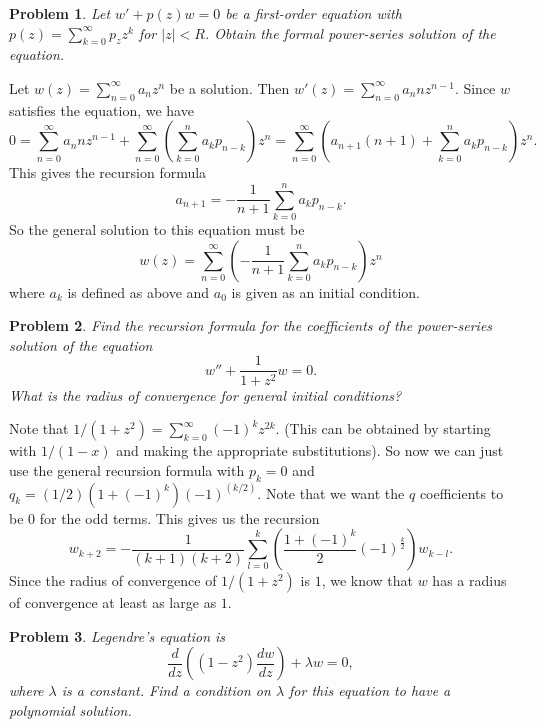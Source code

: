\documentclass{article}
\newtheorem{problem}{Problem}
\begin{document}
\begin{problem}
Let $w' + p(z)w = 0$ be a first-order equation with $p(z) = \sum_{k=0}^{\infty} p_zz^k$ for $|z| < R$. Obtain the formal power-series solution of the equation.
\end{problem}

Let $w(z) = \sum_{n=0}^{\infty} a_n z^n$ be a solution. Then $w'(z) = \sum_{n=0}^{\infty} a_n n z^{n-1}$. Since $w$ satisfies the equation, we have
\[
0 = \sum_{n=0}^{\infty} a_n n z^{n-1} + \sum_{n=0}^{\infty} \left ( \sum_{k=0}^n a_k p_{n-k} \right ) z^n = \sum_{n=0}^{\infty} \left ( a_{n+1} (n+1) + \sum_{k=0}^n a_k p_{n-k} \right ) z^n.
\]
This gives the recursion formula
\[
a_{n+1} = - \frac{1}{n+1} \sum_{k=0}^n a_k p_{n-k}.
\]
So the general solution to this equation must be
\[
w(z) = \sum_{n=0}^{\infty} \left ( - \frac{1}{n+1} \sum_{k=0}^n a_k p_{n-k} \right ) z^n
\]
where $a_k$ is defined as above and $a_0$ is given as an initial condition.

\begin{problem}
Find the recursion formula for the coefficients of the power-series solution of the equation
\[
w'' + \frac{1}{1 + z^2} w = 0.
\]
What is the radius of convergence for general initial conditions?
\end{problem}

Note that $1/(1 + z^2) = \sum_{k=0}^{\infty} (-1)^k z^{2k}$. (This can be obtained by starting with $1/(1-x)$ and making the appropriate substitutions). So now we can just use the general recursion formula with $p_k = 0$ and $q_k = (1/2) (1 + (-1)^k) (-1)^(k/2)$. Note that we want the $q$ coefficients to be $0$ for the odd terms. This gives us the recursion
\[
w_{k+2} = - \frac{1}{(k+1)(k+2)} \sum_{l=0}^k \left ( \frac{1 + (-1)^k}{2} (-1)^{\frac{k}{2}} \right ) w_{k-l}.
\]
Since the radius of convergence of $1/(1 + z^2)$ is $1$, we know that $w$ has a radius of convergence at least as large as $1$.

\begin{problem}
Legendre's equation is
\[
\frac{d}{dz} \left ( \left ( 1 - z^2 \right ) \frac{dw}{dz} \right ) + \lambda w = 0,
\]
where $\lambda$ is a constant. Find a condition on $\lambda$ for this equation to have a polynomial solution.
\end{problem}
\end{document}
